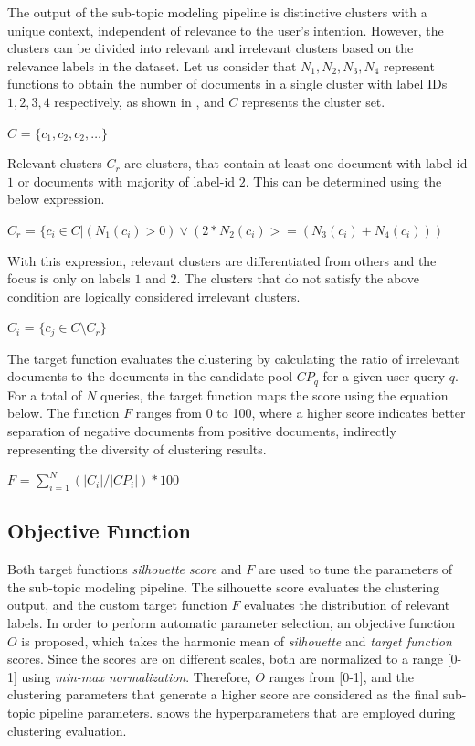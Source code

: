 		
The output of the sub-topic modeling pipeline is distinctive clusters with a unique context, independent of relevance to the user's intention. However, the clusters can be divided into relevant and irrelevant clusters based on the relevance labels in the dataset. Let us consider that $N_1, N_2, N_3, N_4$ represent functions to obtain the number of documents in a single cluster with label IDs $1, 2, 3, 4$ respectively, as shown in , and $C$ represents the cluster set.
		
		\centerline{$C$ = $\{c_1, c_2, c_2,\dots\}$}
		
		Relevant clusters $C_r$ are clusters, that contain at least one document with label-id $1$ or documents with majority of label-id $2$. This can be determined using the below expression.
		
		\centerline{$C_r$ = $\{c_i \in C | (N_1(c_i) > 0) \lor (2 * N_2(c_i) >= (N_3(c_i) + N_4(c_i))) $}
		
		With this expression, relevant clusters are differentiated from others and the focus is only on labels $1$ and $2$. The clusters that do not satisfy the above condition are logically considered irrelevant clusters. 
		
		\centerline{$C_i$ = $\{c_j \in C \setminus C_r\} $}
		
The target function evaluates the clustering by calculating the ratio of irrelevant documents to the documents in the candidate pool $CP_q$ for a given user query $q$. For a total of $N$ queries, the target function maps the score using the equation below. The function $F$ ranges from 0 to 100, where a higher score indicates better separation of negative documents from positive documents, indirectly representing the diversity of clustering results.

		
		\centerline{$F$ = $\sum\limits_{i=1}^N (|C_i|/|CP_i|) * 100 $}
		
		\subsection{Objective Function} Both target functions \emph{silhouette score} and $F$ are used to tune the parameters of the sub-topic modeling pipeline. The silhouette score evaluates the clustering output, and the custom target function $F$ evaluates the distribution of relevant labels. In order to perform automatic parameter selection, an objective function $O$ is proposed, which takes the harmonic mean of \textit{silhouette} and \textit{target function} scores. Since the scores are on different scales, both are normalized to a range [0-1] using \textit{min-max normalization}. Therefore, $O$ ranges from [0-1], and the clustering parameters that generate a higher score are considered as the final sub-topic pipeline parameters.  shows the hyperparameters that are employed during clustering evaluation.\\
		
